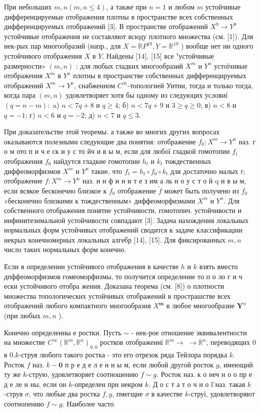 \documentclass[10pt]{article}
\begin{document}
При небольших $m, n(m, n \leqslant 4)$, а также при $n=1$ и любом $m$ устойчивые дифференцируемые отображения плотны в пространстве всех собственных дифференцируемых отображений [3]. В пространстве отображений $X^{9} \rightarrow Y^{9}$ устойчивые отображения не составляют всюду плотного множества (см. [1]). Для нек-рых пар многообразий (напр., для $X=\mathbb{R} P^{19}, Y=\mathbb{R}^{19}$ ) вообще нет ни одного устойчивого отображения $X$ в $Y$. Найдены [14], [15] все "устойчивые размерности» $(m, n)$ : для любых гладких многообразий $X^{m}$ и $Y^{n}$ устоїчивые отображения $X^{m}$ в $Y^{n}$ плотны в пространстве собственных дифференцируемых отображений $X^{m} \rightarrow Y^{n}$, снабженном $C^{\infty}$-топологией Уитни, тогда и только тогда, когда пара $(m, n)$ удовлетворяет хотя бы одному из следуюцих условиї $(q=n-m):$ a) $n<7 q+8$ и $q \geqslant 4$; б) $n<7 q+9$ и $3 \geqslant q \geqslant 0$; в) $n<8$ и $q=-1$; г) $n<6$ и $q=-2$; д) $n<7$ и $q \leqslant 3$.

При доказательстве этой теоремы. а также во многих других вопросах оказываются полезными следующие два понятия: отображение $f_{0}: X^{m} \rightarrow Y^{n}$ наз. г о м ото п и ч е ск и у с то йч и в ы м, если для любої гладкой гомотопии $f_{t}$ отображения $f_{0}$ найдутся гладкие гомотопии $h_{t}$ и $k_{t}$ тождественных диффеоморфизмов $X^{m}$ и $Y^{n}$ такие, что $f_{t}=h_{t} \circ f_{0} \circ k_{t}$ для достаточно малых $t$; отображение $f: X^{m} \rightarrow Y^{n}$ наз. и н ф и н и т е з им а ль н о у с т о й q и в ы м, если всякое бесконечно близкое к $f_{0}$ отображение $\tilde{f}$ может быть получено из $f_{0}$ «бесконечно близкими к тождественным» диффеоморфизмами $X^{m}$ и $Y^{n}$. Для собственного отображения понятие устойчивости, гомотопич. устойчивости и инфинитезимальной устойчивости совпадают [3]. Задача нахождения локальных нормальных форм устойчивых отображений сводится к задаче классификаџии некрых конечномерных локальных алгебр [14], [15]. Для фиксированных $m, n$ число таких нормальных форм конечно.

Если в определении устойчивого отображения в качестве $h$ и $k$ взять вместо дпффеоморфизмов гомеоморфизмы, то получится определение то п о ло г и ч ески устойчивого отобра жения. Доказана теорема (см. [8]) о плотности множества топологических устойчивых отображений в прострашстве всех отображений любого компактного многообразия $X^{\boldsymbol{m}}$ в любое многообразие $\boldsymbol{Y}^{n}$ (при любых $m, n$ ).

Конечно определенны е ростки. Пусть $\sim$ - нек-рое отношение эквивалентности на множестве $C^{\infty}\left(\mathbb{R}^{m}, \mathbb{R}^{n}\right)_{0,0}$ ростков отображениї $\mathbb{R}^{m} \rightarrow$ $\rightarrow \mathbb{R}^{n}$, переводящих 0 в $0 . k$-струя любого такого ростка - это его отрезок ряда Тейлора порядка $k$. Росток $f$ наз. $k-\mathbf{0}$ п р е д е л е н н ы м, если любой другой росток $g$, имеющий ту же $k$-струю, удовлетворяет соотношению $f \sim g$. Росток наз. к о неч н о о пр е д е ле н ны, если он $k$-определен при некром $k$. Д о с т а т о ч н о ї̈ наз. такая $k$-струя $\sigma$, что любые два ростка $f, g$, пмегщие $\sigma$ в качестве $k$-струі, удовлетворяют соотнопению $f \sim g$. Наиболее часто
\end{document}
